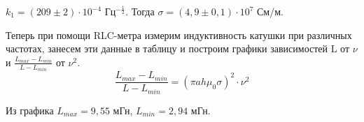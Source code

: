 \documentclass[a4paper,12pt]{article}
\begin{document}
$k_1 = (209 \pm 2) \cdot 10^{-4}$ Гц$^{-\frac{1}{2}}$. Тогда $\sigma = (4,9 \pm 0,1) \cdot 10^7$ См/м.

Теперь при помощи RLC-метра измерим индуктивность катушки при различных частотах, занесем эти данные в таблицу и построим графики зависимостей L от $\nu$ и $\frac{L_{max} - L_{min}}{L-L_{min}}$ от $\nu^2$.
\[\frac{L_{max} - L_{min}}{L-L_{min}} = (\pi ah\mu_0 \sigma)^2 \cdot \nu^2\]


Из графика $L_{max} = 9,55$ мГн, $L_{min} = 2,94$ мГн.

\begin{figure}[H]
\begin{minipage}[h]{0.45\linewidth}	
\end{minipage}
\begin{minipage}[h]{0.7\linewidth}
\end{minipage}
\end{figure}
\end{document}
